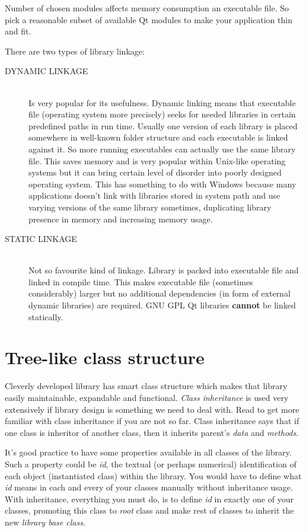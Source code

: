 Number of chosen modules affects memory consumption an executable file. So pick a reasonable subset of available Qt modules to make your application thin and fit.

\begin{fdocextra}
There are two types of library linkage:
\begin{description}
\item[DYNAMIC LINKAGE] \hfill \\
Is very popular for its usefulness. Dynamic linking means that executable file (operating system more precisely) seeks for needed libraries in certain predefined paths in run time. Usually one version of each library is placed somewhere in well-known folder structure and each executable is linked against it. So more running executables can actually use the same library file. This saves memory and is very popular within Unix-like operating systems but it can bring certain level of disorder into poorly designed operating system. This has something to do with Windows because many applications doesn't link with libraries stored in system path and use varying versions of the same library sometimes, duplicating library presence in memory and increasing memory usage.
\item[STATIC LINKAGE] \hfill \\
Not so favourite kind of linkage. Library is packed into executable file and linked in compile time. This makes executable file (sometimes considerably) larger but no additional dependencies (in form of external dynamic libraries) are required. GNU GPL Qt libraries \textbf{cannot} be linked statically.
\end{description}
\end{fdocextra}

\section{Tree-like class structure}
Cleverly developed library has smart class structure which makes that library easily maintainable, expandable and functional. \textit{Class inheritance} is used very extensively if library design is something we need to deal with. Read \citep[p.~708-783]{prata:cprimer} to get more familiar with \cpp class inheritance if you are not so far. Class inheritance says that if one class is inheritor of another class, then it inherits parent's \textit{data} and \textit{methods}.

It's good practice to have some properties available in all classes of the library. Such a property could be \eg \textit{id}, the textual (or perhaps numerical) identification of each object (instantiated class) within the library. You would have to define what \textit{id} means in each and every of your classes manually without inheritance usage. With inheritance, everything you must do, is to define \textit{id} in exactly one of your classes, promoting this class to \textit{root} class and make rest of classes to inherit the new \textit{library base class}.

